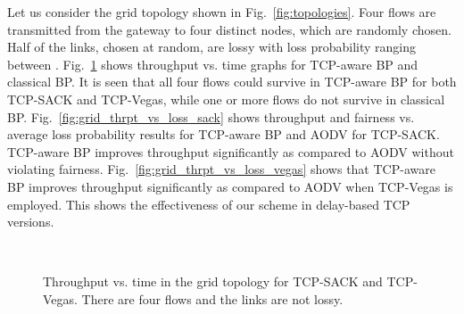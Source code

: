 \documentclass[conference]{IEEEtran}
\begin{document}
Let us consider the grid topology shown in Fig.~\ref{fig:topologies}. Four flows are transmitted from the gateway to four distinct nodes, which are randomly chosen. Half of the links, chosen at random, are lossy with loss probability ranging between . Fig.~\ref{fig:grid_thrpt_time_results} shows throughput vs. time graphs for TCP-aware BP and classical BP. It is seen that all four flows could survive in TCP-aware BP for both TCP-SACK and TCP-Vegas, while one or more flows do not survive in classical BP. Fig.~\ref{fig:grid_thrpt_vs_loss_sack} shows throughput and fairness vs. average loss probability results for TCP-aware BP and AODV for TCP-SACK. TCP-aware BP improves throughput significantly as compared to AODV without violating fairness. Fig.~\ref{fig:grid_thrpt_vs_loss_vegas} shows that TCP-aware BP improves throughput significantly as compared to AODV when TCP-Vegas is employed. This shows the effectiveness of our scheme in delay-based TCP versions.



\begin{figure}[t!]
\vspace{-0pt}
\begin{center}
 \hspace{-0pt} \\
 \hspace{-0pt}
\end{center}
\begin{center}
\vspace{-15pt}
\caption{\label{fig:grid_thrpt_time_results} \scriptsize Throughput vs. time in the grid topology for TCP-SACK and TCP-Vegas. There are four flows and the links are not lossy.
}
\end{center}
\vspace{-15pt}
\end{figure}
\end{document}
